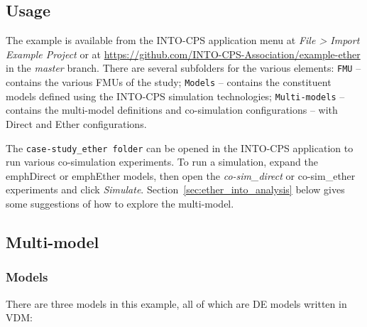 \subsection{Usage}
\label{sec:ether_usage}

The example is available from the INTO-CPS application menu at \emph{File > Import Example Project} or at  \url{https://github.com/INTO-CPS-Association/example-ether} in the \emph{master} branch. There are several subfolders for the various elements: \texttt{FMU} -- contains the various FMUs of the study; \texttt{Models} -- contains the constituent models defined using the INTO-CPS simulation technologies; \texttt{Multi-models} -- contains the multi-model definitions and co-simulation configurations -- with Direct and Ether configurations.

The \texttt{case-study\_ether folder} can be opened in the INTO-CPS application to run various co-simulation experiments. To run a simulation, expand the emph{Direct} or emph{Ether} models, then open the \emph{co-sim\_direct} or {co-sim\_ether} experiments and click \emph{Simulate}. Section~\ref{sec:ether_into_analysis} below gives some suggestions of how to explore the multi-model.




\subsection{Multi-model}
\label{sec:ether_into_mm}

\subsubsection{Models}

There are three models in this example, all of which are DE models written in VDM:

